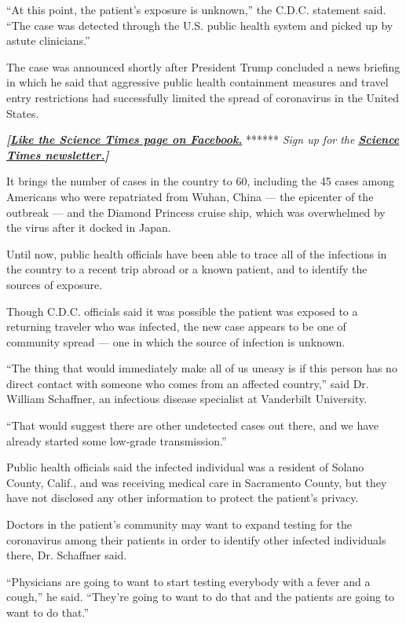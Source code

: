 ``At this point, the patient's exposure is unknown,'' the C.D.C.
statement said. ``The case was detected through the U.S. public health
system and picked up by astute clinicians.''

The case was announced shortly after President Trump concluded a news
briefing in which he said that aggressive public health containment
measures and travel entry restrictions had successfully limited the
spread of coronavirus in the United States.

\textbf{\emph{{[}}\href{http://on.fb.me/1paTQ1h}{\emph{Like the Science
Times page on Facebook.}}} ****** \emph{\textbar{} Sign up for the}
\textbf{\href{http://nyti.ms/1MbHaRU}{\emph{Science Times
newsletter.}}\emph{{]}}}

It brings the number of cases in the country to 60, including the 45
cases among Americans who were repatriated from Wuhan, China --- the
epicenter of the outbreak --- and the Diamond Princess cruise ship,
which was overwhelmed by the virus after it docked in Japan.

Until now, public health officials have been able to trace all of the
infections in the country to a recent trip abroad or a known patient,
and to identify the sources of exposure.

Though C.D.C. officials said it was possible the patient was exposed to
a returning traveler who was infected, the new case appears to be one of
community spread --- one in which the source of infection is unknown.

``The thing that would immediately make all of us uneasy is if this
person has no direct contact with someone who comes from an affected
country,'' said Dr. William Schaffner, an infectious disease specialist
at Vanderbilt University.

``That would suggest there are other undetected cases out there, and we
have already started some low-grade transmission.''

Public health officials said the infected individual was a resident of
Solano County, Calif., and was receiving medical care in Sacramento
County, but they have not disclosed any other information to protect the
patient's privacy.

Doctors in the patient's community may want to expand testing for the
coronavirus among their patients in order to identify other infected
individuals there, Dr. Schaffner said.

``Physicians are going to want to start testing everybody with a fever
and a cough,'' he said. ``They're going to want to do that and the
patients are going to want to do that.''

